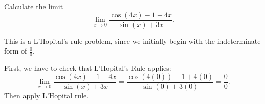 \documentclass{ximera}
\author{Emma Smith Zbarsky}
\begin{document}
\begin{exercise}

Calculate the limit \[\lim_{x \to 0} \frac{\cos(4x)-1+4x}{\sin(x)+3x}.\]


\begin{hint}
This is a L'Hopital's rule problem, since we initially begin with the
indeterminate form of $\frac{0}{0}$.
\end{hint}


\begin{hint}
First, we have to check that L'Hopital's Rule applies:
\[\lim_{x\to 0} \frac{\cos(4x)-1+4x}{\sin(x)+3x} = \frac{\cos(4(0))-1+4(0)}{\sin(0)+3(0)} = \frac{0}{0}.\]
Then apply L'Hopital rule. 
\end{hint}


\begin{multipleChoice}
\end{multipleChoice}

\end{exercise}
\end{document}
